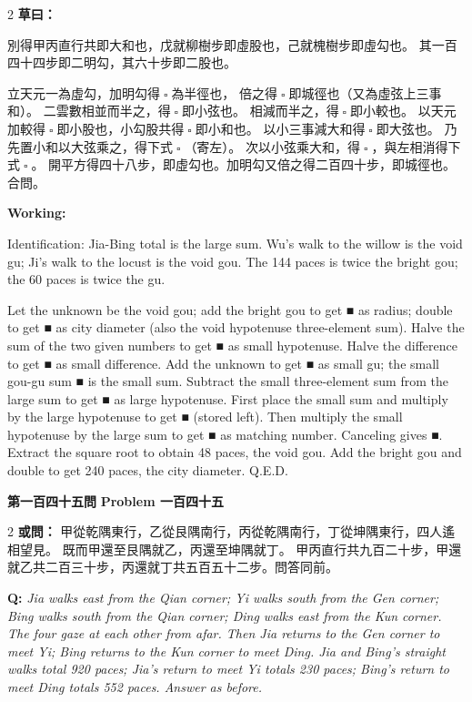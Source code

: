 \documentclass[11pt,a4paper]{article}
\let\origsquare\square
\renewcommand{\square}{\ensuremath{\origsquare}}%
\newcommand{\wen}[1]{%
  \par\vspace{0.5em}%
  \noindent\textcolor{problemcolor}{\textbf{第#1問}}%
  \hfill\textcolor{problemcolor}{\textbf{Problem #1}}\par\nopagebreak%
  \vspace{0.3em}%
}
\newcommand{\owen}[1]{%
  \noindent\textcolor{problemcolor}{\textbf{或問：}}{\tradfont #1}\par\nopagebreak%
}
\newcommand{\oweneng}[1]{%
  \noindent\textcolor{engcolor}{\textbf{Q: }}{\itshape #1}\par\nopagebreak%
}
\newcommand{\tsaoyue}[1]{%
  \noindent\textcolor{workcolor}{\textbf{草曰：}}{\tradfont #1}\par%
}
\newcommand{\tsaoyueeng}[1]{%
  \noindent\textcolor{engcolor}{\textbf{Working: }}{\small #1}\par%
}
\begin{document}
\begin{paracol}{2}
\tsaoyue{%
別得甲丙直行共即大和也，戊就柳樹步即虛股也，己就槐樹步即虛勾也。
其一百四十四步即二明勾，其六十步即二股也。

立天元一為虛勾，加明勾得$ \; \square \; $為半徑也，
倍之得$ \; \square \; $即城徑也（又為虛弦上三事和）。
二雲數相並而半之，得$ \; \square \; $即小弦也。
相減而半之，得$ \; \square \; $即小較也。
以天元加較得$ \; \square \; $即小股也，小勾股共得$ \; \square \; $即小和也。
以小三事減大和得$ \; \square \; $即大弦也。
乃先置小和以大弦乘之，得下式$ \; \square \; $（寄左）。
次以小弦乘大和，得$ \; \square \; $，與左相消得下式$ \; \square \; $。
開平方得四十八步，即虛勾也。加明勾又倍之得二百四十步，即城徑也。合問。}
\switchcolumn
\tsaoyueeng{%
Identification: Jia-Bing total is the large sum. Wu's walk to the willow is the void gu; Ji's walk to the locust is the void gou. The 144 paces is twice the bright gou; the 60 paces is twice the gu.

Let the unknown be the void gou; add the bright gou to get ■ as radius; double to get ■ as city diameter (also the void hypotenuse three-element sum). Halve the sum of the two given numbers to get ■ as small hypotenuse. Halve the difference to get ■ as small difference. Add the unknown to get ■ as small gu; the small gou-gu sum ■ is the small sum. Subtract the small three-element sum from the large sum to get ■ as large hypotenuse. First place the small sum and multiply by the large hypotenuse to get ■ (stored left). Then multiply the small hypotenuse by the large sum to get ■ as matching number. Canceling gives ■. Extract the square root to obtain 48 paces, the void gou. Add the bright gou and double to get 240 paces, the city diameter. Q.E.D.}
\end{paracol}

\vspace{0.5cm}

\wen{一百四十五}

\begin{paracol}{2}
\owen{%
甲從乾隅東行，乙從艮隅南行，丙從乾隅南行，丁從坤隅東行，四人遙相望見。
既而甲還至艮隅就乙，丙還至坤隅就丁。
甲丙直行共九百二十步，甲還就乙共二百三十步，丙還就丁共五百五十二步。問答同前。}
\switchcolumn
\oweneng{%
Jia walks east from the Qian corner; Yi walks south from the Gen corner; Bing walks south from the Qian corner; Ding walks east from the Kun corner. The four gaze at each other from afar. Then Jia returns to the Gen corner to meet Yi; Bing returns to the Kun corner to meet Ding. Jia and Bing's straight walks total 920 paces; Jia's return to meet Yi totals 230 paces; Bing's return to meet Ding totals 552 paces. Answer as before.}
\end{paracol}
\end{document}

